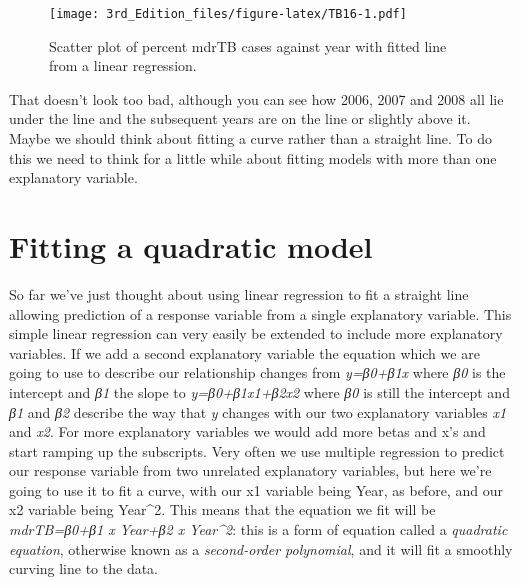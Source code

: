 \documentclass[
]{book}
\newenvironment{Shaded}{\begin{snugshade}}{\end{snugshade}}
\newcommand{\DataTypeTok}[1]{\textcolor[rgb]{0.13,0.29,0.53}{#1}}
\newcommand{\KeywordTok}[1]{\textcolor[rgb]{0.13,0.29,0.53}{\textbf{#1}}}
\newcommand{\NormalTok}[1]{#1}
\newcommand{\OperatorTok}[1]{\textcolor[rgb]{0.81,0.36,0.00}{\textbf{#1}}}
\newcommand{\StringTok}[1]{\textcolor[rgb]{0.31,0.60,0.02}{#1}}
\begin{document}
\begin{Shaded}
\end{Shaded}

\begin{figure}
\centering
\texttt{[image: 3rd\_Edition\_files/figure-latex/TB16-1.pdf]}
\caption{\label{fig:TB16}Scatter plot of percent mdrTB cases against year with fitted line from a linear regression.}
\end{figure}

That doesn't look too bad, although you can see how 2006, 2007 and 2008 all lie under the line and the subsequent years are on the line or slightly above it. Maybe we should think about fitting a curve rather than a straight line. To do this we need to think for a little while about fitting models with more than one explanatory variable.

\hypertarget{fitting-a-quadratic-model}{%
\section{Fitting a quadratic model}\label{fitting-a-quadratic-model}}

So far we've just thought about using linear regression to fit a straight line allowing prediction of a response variable from a single explanatory variable. This simple linear regression can very easily be extended to include more explanatory variables. If we add a second explanatory variable the equation which we are going to use to describe our relationship changes from \emph{y=β0+β1x} where \emph{β0} is the intercept and \emph{β1} the slope to \emph{y=β0+β1x1+β2x2} where \emph{β0} is still the intercept and \emph{β1} and \emph{β2} describe the way that \emph{y} changes with our two explanatory variables \emph{x1} and \emph{x2}. For more explanatory variables we would add more betas and x's and start ramping up the subscripts. Very often we use multiple regression to predict our response variable from two unrelated explanatory variables, but here we're going to use it to fit a curve, with our x1 variable being Year, as before, and our x2 variable being Year\^{}2. This means that the equation we fit will be \emph{mdrTB=β0+β1 x Year+β2 x Year\^{}2}: this is a form of equation called a \emph{quadratic equation}, otherwise known as a \emph{second-order polynomial}, and it will fit a smoothly curving line to the data.
\end{document}
